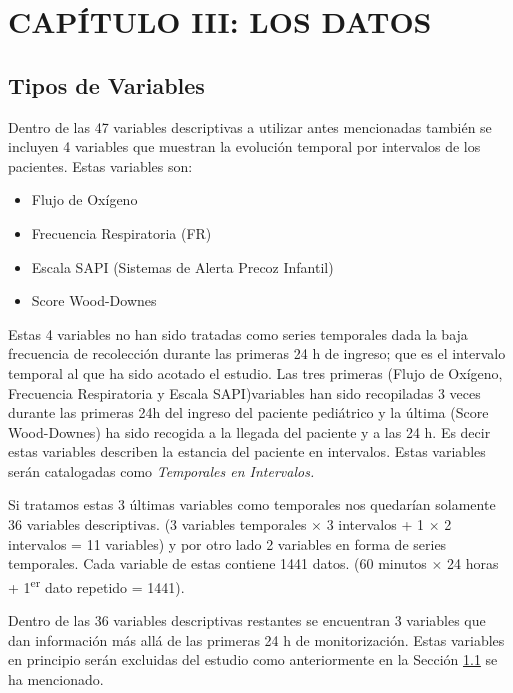 \section{CAPÍTULO III: LOS DATOS}\label{sec:los-datos}

\subsection{Tipos de Variables}\label{sec:tiposdevariables}

Dentro de las 47 variables descriptivas a utilizar antes mencionadas también se incluyen 4 variables que muestran la evolución temporal por intervalos de los pacientes. Estas variables son:

\begin{itemize}
    \item Flujo de Oxígeno
    \item Frecuencia Respiratoria (FR)
    \item Escala SAPI (Sistemas de Alerta Precoz Infantil)
    \item Score Wood-Downes
\end{itemize}

Estas 4 variables no han sido tratadas como series temporales dada la baja frecuencia de recolección durante las primeras 24 h de ingreso; que es el intervalo temporal al que ha sido acotado el estudio. Las tres primeras (Flujo de Oxígeno, Frecuencia Respiratoria y Escala SAPI)variables han sido recopiladas 3 veces durante las primeras 24h del ingreso del paciente pediátrico y la última (Score Wood-Downes) ha sido recogida a la llegada del paciente y a las 24 h. Es decir estas variables describen la estancia del paciente en intervalos.  Estas variables serán catalogadas como \textit{Temporales en Intervalos.} 

Si tratamos estas 3 últimas variables como temporales nos quedarían solamente 36 variables descriptivas. (3 variables temporales $\times$ 3 intervalos + 1 $\times$ 2 intervalos = 11 variables) y por otro lado 2 variables en forma de series temporales. Cada variable de estas contiene 1441 datos. (60 minutos $\times$ 24 horas + 1\textsuperscript{er} dato repetido
= 1441).

Dentro de las 36 variables descriptivas restantes se encuentran 3 variables que dan información más allá de las primeras 24 h de monitorización. Estas variables en principio serán excluidas del estudio como anteriormente en la Sección \ref{sec:tiposdevariables} se ha mencionado. 

